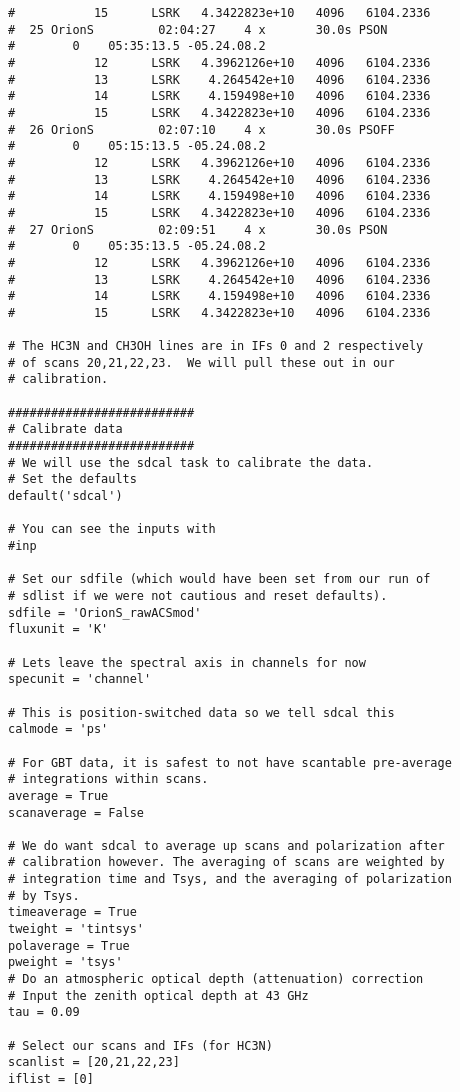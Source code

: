 \begin{verbatim}
#           15      LSRK   4.3422823e+10   4096   6104.2336
#  25 OrionS         02:04:27    4 x       30.0s PSON
#        0    05:35:13.5 -05.24.08.2
#           12      LSRK   4.3962126e+10   4096   6104.2336
#           13      LSRK    4.264542e+10   4096   6104.2336
#           14      LSRK    4.159498e+10   4096   6104.2336
#           15      LSRK   4.3422823e+10   4096   6104.2336
#  26 OrionS         02:07:10    4 x       30.0s PSOFF
#        0    05:15:13.5 -05.24.08.2
#           12      LSRK   4.3962126e+10   4096   6104.2336
#           13      LSRK    4.264542e+10   4096   6104.2336
#           14      LSRK    4.159498e+10   4096   6104.2336
#           15      LSRK   4.3422823e+10   4096   6104.2336
#  27 OrionS         02:09:51    4 x       30.0s PSON
#        0    05:35:13.5 -05.24.08.2
#           12      LSRK   4.3962126e+10   4096   6104.2336
#           13      LSRK    4.264542e+10   4096   6104.2336
#           14      LSRK    4.159498e+10   4096   6104.2336
#           15      LSRK   4.3422823e+10   4096   6104.2336

# The HC3N and CH3OH lines are in IFs 0 and 2 respectively
# of scans 20,21,22,23.  We will pull these out in our
# calibration.

##########################
# Calibrate data
##########################
# We will use the sdcal task to calibrate the data.
# Set the defaults
default('sdcal')

# You can see the inputs with
#inp

# Set our sdfile (which would have been set from our run of
# sdlist if we were not cautious and reset defaults).
sdfile = 'OrionS_rawACSmod'
fluxunit = 'K'

# Lets leave the spectral axis in channels for now
specunit = 'channel'

# This is position-switched data so we tell sdcal this
calmode = 'ps'

# For GBT data, it is safest to not have scantable pre-average
# integrations within scans.
average = True
scanaverage = False

# We do want sdcal to average up scans and polarization after
# calibration however. The averaging of scans are weighted by 
# integration time and Tsys, and the averaging of polarization 
# by Tsys.
timeaverage = True
tweight = 'tintsys'
polaverage = True
pweight = 'tsys'
# Do an atmospheric optical depth (attenuation) correction
# Input the zenith optical depth at 43 GHz
tau = 0.09

# Select our scans and IFs (for HC3N)
scanlist = [20,21,22,23]
iflist = [0]


\end{verbatim}
